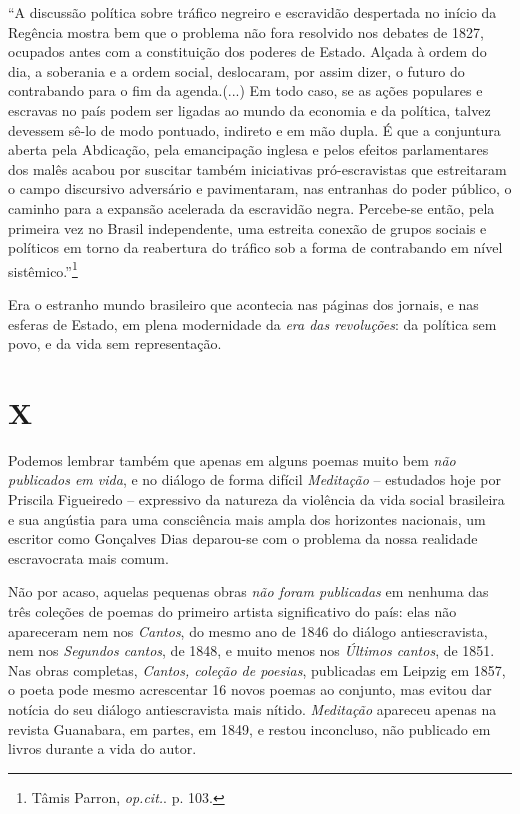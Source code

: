 ``A discussão política sobre tráfico negreiro e escravidão despertada no
início da Regência mostra bem que o problema não fora resolvido nos
debates de 1827, ocupados antes com a constituição dos poderes de
Estado. Alçada à ordem do dia, a soberania e a ordem social, deslocaram,
por assim dizer, o futuro do contrabando para o fim da agenda.(...) Em
todo caso, se as ações populares e escravas no país podem ser ligadas ao
mundo da economia e da política, talvez devessem sê-lo de modo pontuado,
indireto e em mão dupla. É que a conjuntura aberta pela Abdicação, pela
emancipação inglesa e pelos efeitos parlamentares dos malês acabou por
suscitar também iniciativas pró-escravistas que estreitaram o campo
discursivo adversário e pavimentaram, nas entranhas do poder público, o
caminho para a expansão acelerada da escravidão negra. Percebe-se então,
pela primeira vez no Brasil independente, uma estreita conexão de grupos
sociais e políticos em torno da reabertura do tráfico sob a forma de
contrabando em nível sistêmico.''\footnote{Tâmis Parron, \emph{op.cit.}.
  p. 103.}

Era o estranho mundo brasileiro que acontecia nas páginas dos jornais, e
nas esferas de Estado, em plena modernidade da \emph{era das
revoluções}: da política sem povo, e da vida sem representação.

\section{X}

Podemos lembrar também que apenas em alguns poemas muito bem \emph{não
publicados em vida}, e no diálogo de forma difícil \emph{Meditação} --
estudados hoje por Priscila Figueiredo -- expressivo da natureza da
violência da vida social brasileira e sua angústia para uma consciência
mais ampla dos horizontes nacionais, um escritor como Gonçalves Dias
deparou-se com o problema da nossa realidade escravocrata mais comum.

Não por acaso, aquelas pequenas obras \emph{não foram publicadas} em
nenhuma das três coleções de poemas do primeiro artista significativo do
país: elas não apareceram nem nos \emph{Cantos}, do mesmo ano de 1846 do
diálogo antiescravista, nem nos \emph{Segundos cantos}, de 1848, e muito
menos nos \emph{Últimos cantos}, de 1851. Nas obras completas,
\emph{Cantos, coleção de poesias}, publicadas em Leipzig em 1857, o
poeta pode mesmo acrescentar 16 novos poemas ao conjunto, mas evitou dar
notícia do seu diálogo antiescravista mais nítido. \emph{Meditação}
apareceu apenas na revista Guanabara, em partes, em 1849, e restou
inconcluso, não publicado em livros durante a vida do autor.

